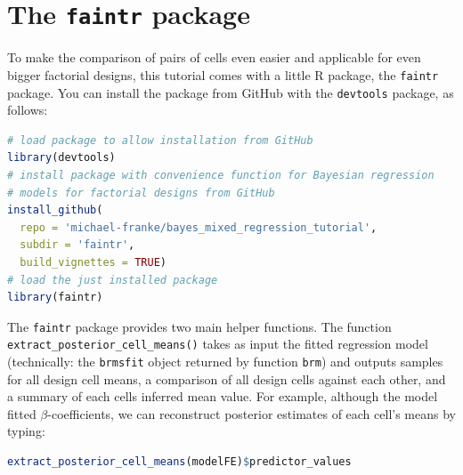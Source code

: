 \documentclass[nobib]{tufte-handout}
\begin{document}
\section{The \texttt{faintr} package}

To make the comparison of pairs of cells even easier and applicable for even bigger factorial designs, this tutorial comes with a little R package, the \texttt{faintr} package.
%
%
You can install the package from GitHub with the \texttt{devtools} package, as follows:

\medskip 

\begin{minipage}[]{1.3\textwidth}
\begin{lstlisting}[language=R]
# load package to allow installation from GitHub
library(devtools)
# install package with convenience function for Bayesian regression 
# models for factorial designs from GitHub
install_github(
  repo = 'michael-franke/bayes_mixed_regression_tutorial', 
  subdir = 'faintr',
  build_vignettes = TRUE)
# load the just installed package
library(faintr)
\end{lstlisting}
\end{minipage}

The \texttt{faintr} package provides two main helper functions.
%
%
The function \texttt{extract\_posterior\_cell\_means()}
takes as input the fitted regression model (technically: the \texttt{brmsfit} object returned
by function \texttt{brm}) and outputs samples for all design cell means, a comparison of all
design cells against each other, and a summary of each cells inferred mean value.
For example, although the model fitted $\beta$-coefficients, we can reconstruct posterior estimates of each cell's means by typing:

\begin{minipage}[]{1.3\textwidth}
\begin{lstlisting}[language=R]
extract_posterior_cell_means(modelFE)$predictor_values
\end{lstlisting}
\end{minipage}
\end{document}
